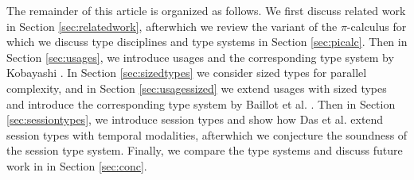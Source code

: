 %
%
The remainder of this article is organized as follows. We first discuss related work in Section \ref{sec:relatedwork}, afterwhich we review the variant of the $\pi$-calculus for which we discuss type disciplines and type systems in Section \ref{sec:picalc}. Then in Section \ref{sec:usages}, we introduce usages and the corresponding type system by Kobayashi \cite{Kobayashi2000}. In Section \ref{sec:sizedtypes} we consider sized types for parallel complexity, and in Section \ref{sec:usagessized} we extend usages with sized types and introduce the corresponding type system by Baillot et al. \cite{BaillotEtAl2021}. Then in Section \ref{sec:sessiontypes}, we introduce session types and show how Das et al. \cite{DasEtAl2018} extend session types with temporal modalities, afterwhich we conjecture the soundness of the session type system. Finally, we compare the type systems and discuss future work in in Section \ref{sec:conc}. 